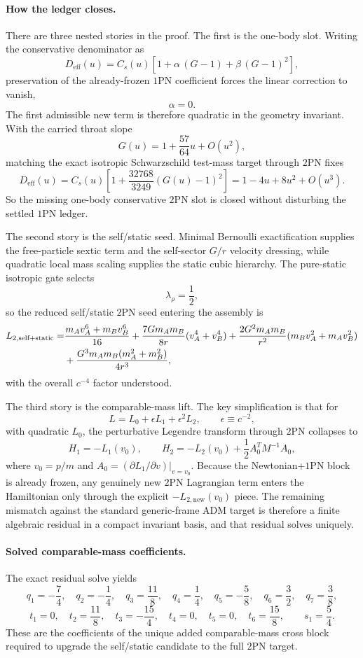 \documentclass[11pt]{article}
\newcommand{\OnePN}{\mathrm{1PN}}
\newcommand{\TwoPN}{\mathrm{2PN}}
\newcommand{\ADM}{\mathrm{ADM}}
\newcommand{\eff}{\mathrm{eff}}
\begin{document}
\paragraph{How the ledger closes.}
There are three nested stories in the proof. The first is the one-body slot. Writing the conservative denominator as
\[
D_{\eff}(u)=C_s(u)\left[1+\alpha\,(G-1)+\beta\,(G-1)^2\right],
\]
preservation of the already-frozen $\OnePN$ coefficient forces the linear correction to vanish,
\[
\alpha=0.
\]
The first admissible new term is therefore quadratic in the geometry invariant. With the carried throat slope
\[
G(u)=1+\frac{57}{64}u+O(u^2),
\]
matching the exact isotropic Schwarzschild test-mass target through $\TwoPN$ fixes
\[
D_{\eff}(u)=C_s(u)\left[1+\frac{32768}{3249}(G(u)-1)^2\right]
=1-4u+8u^2+O(u^3).
\]
So the missing one-body conservative $2$PN slot is closed without disturbing the settled $1$PN ledger.

The second story is the self/static seed. Minimal Bernoulli exactification supplies the free-particle sextic term and the self-sector $G/r$ velocity dressing, while quadratic local mass scaling supplies the static cubic hierarchy. The pure-static isotropic gate selects
\[
\lambda_\rho=\frac12,
\]
so the reduced self/static $\TwoPN$ seed entering the assembly is
\begin{align}
L_{2,\text{self+static}}=
&\frac{m_A v_A^6+m_B v_B^6}{16}
+\frac{7Gm_A m_B}{8r}(v_A^4+v_B^4)
+\frac{2G^2 m_A m_B}{r^2}(m_B v_A^2+m_A v_B^2) \notag\\
&+\frac{G^3m_A m_B(m_A^2+m_B^2)}{4r^3},
\end{align}
with the overall $c^{-4}$ factor understood.

The third story is the comparable-mass lift. The key simplification is that for
\[
L=L_0+\epsilon L_1+\epsilon^2 L_2,
\qquad \epsilon\equiv c^{-2},
\]
with quadratic $L_0$, the perturbative Legendre transform through $\TwoPN$ collapses to
\[
H_1=-L_1(v_0),
\qquad
H_2=-L_2(v_0)+\frac12 A_0^T M^{-1}A_0,
\]
where $v_0=p/m$ and $A_0=(\partial L_1/\partial v)|_{v=v_0}$. Because the Newtonian+$\OnePN$ block is already frozen, any genuinely new $\TwoPN$ Lagrangian term enters the Hamiltonian only through the explicit $-L_{2,\text{new}}(v_0)$ piece. The remaining mismatch against the standard generic-frame $\ADM$ target is therefore a finite algebraic residual in a compact invariant basis, and that residual solves uniquely.

\paragraph{Solved comparable-mass coefficients.}
The exact residual solve yields
\[
q_1=-\frac74,\quad
q_2=-\frac14,\quad
q_3=\frac{11}{8},\quad
q_4=\frac14,\quad
q_5=-\frac58,\quad
q_6=\frac32,\quad
q_7=\frac38,
\]
\[
t_1=0,\quad
 t_2=\frac{11}{8},\quad
 t_3=-\frac{15}{4},\quad
 t_4=0,\quad
 t_5=0,\quad
 t_6=\frac{15}{8},
\qquad
s_1=\frac54.
\]
These are the coefficients of the unique added comparable-mass cross block required to upgrade the self/static candidate to the full $\TwoPN$ target.
\end{document}
